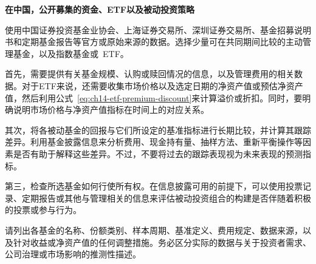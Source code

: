 
\textbf{在中国，公开募集的资金、ETF以及被动投资策略}

使用中国证券投资基金业协会、上海证券交易所、深圳证券交易所、基金招募说明书和定期基金报告等官方或原始来源的数据。选择少量可在共同期间比较的主动管理基金，以及指数基金或~ETF。

首先，需要提供有关基金规模、认购或赎回情况的信息，以及管理费用的相关数据。对于ETF来说，还需要收集市场价格以及选定日期的净资产值或预估净资产值，然后利用公式~\ref{eq:ch14-etf-premium-discount}来计算溢价或折扣。同时，要明确说明市场价格与净资产值指标在时间上的对应关系。

其次，将各被动基金的回报与它们所设定的基准指标进行长期比较，并计算其跟踪差异。利用基金披露信息来分析费用、现金持有量、抽样方法、重新平衡操作等因素是否有助于解释这些差异。不过，不要将过去的跟踪表现视为未来表现的预测指标。

第三，检查所选基金如何行使所有权。在信息披露可用的前提下，可以使用投票记录、定期报告或其他与管理相关的信息来评估被动投资组合的构建是否伴随着积极的投票或参与行为。

请列出各基金的名称、份额类别、样本周期、基准定义、费用规定、数据来源，以及针对收益或净资产值的任何调整措施。务必区分实际的数据与关于投资者需求、公司治理或市场影响的推测性描述。



